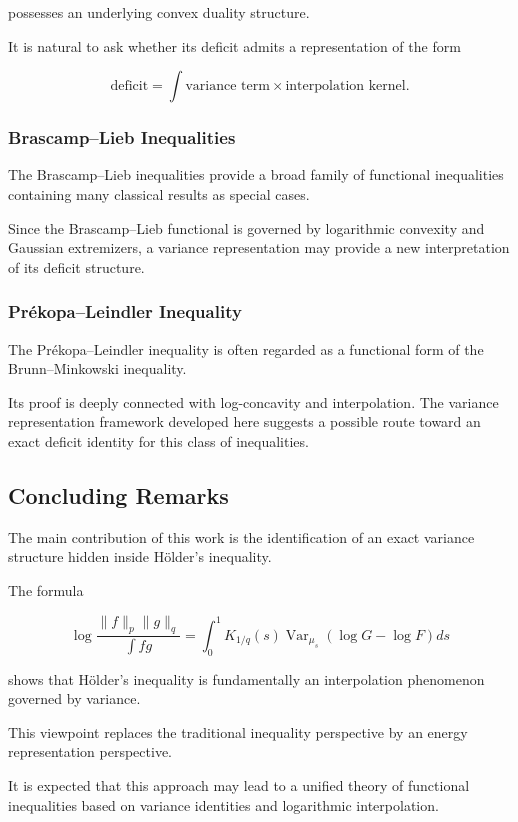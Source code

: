 \documentclass[11pt]{amsart}
\begin{document}
possesses an underlying convex duality structure.

It is natural to ask whether its deficit admits a representation of
the form

\[
\text{deficit}
=
\int
\text{variance term}
\times
\text{interpolation kernel}.
\]


\subsubsection{Brascamp--Lieb Inequalities}


The Brascamp--Lieb inequalities provide a broad family of functional
inequalities containing many classical results as special cases.

Since the Brascamp--Lieb functional is governed by logarithmic
convexity and Gaussian extremizers, a variance representation may
provide a new interpretation of its deficit structure.


\subsubsection{Prékopa--Leindler Inequality}


The Prékopa--Leindler inequality is often regarded as a functional
form of the Brunn--Minkowski inequality.

Its proof is deeply connected with log-concavity and interpolation.
The variance representation framework developed here suggests a
possible route toward an exact deficit identity for this class of
inequalities.


\subsection{Concluding Remarks}


The main contribution of this work is the identification of an exact
variance structure hidden inside Hölder's inequality.

The formula

\[
\boxed{
\log
\frac{
\|f\|_p\|g\|_q
}{
\int fg
}
=
\int_0^1
K_{1/q}(s)
\operatorname{Var}_{\mu_s}
(
\log G-\log F
)
ds
}
\]

shows that Hölder's inequality is fundamentally an interpolation
phenomenon governed by variance.

This viewpoint replaces the traditional inequality perspective by an
energy representation perspective.

It is expected that this approach may lead to a unified theory of
functional inequalities based on variance identities and
logarithmic interpolation.
\end{document}
